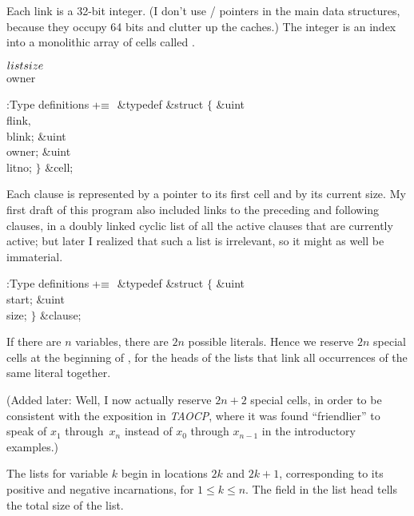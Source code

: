 Each link is a 32-bit integer. (I don't use \CEE/ pointers in the main
data structures, because they occupy 64 bits and clutter up the caches.)
The integer is an index into a monolithic array of cells called .

\Y\B\4\D$\\{listsize}$ \5
\\{owner}\par
\Y\B\4:Type definitions\X${}\mathrel+\equiv{}$\6
\&{typedef} \&{struct} ${}\{{}$\1\6
\&{uint} \\{flink}${},{}$ \\{blink};\6
\&{uint} \\{owner};\6
\&{uint} \\{litno};\2\6
${}\}{}$ \&{cell};\par
\fi

Each clause is represented by a pointer to its first cell and by its
current size. My first draft of this program also included links to the
preceding and following clauses, in a doubly linked cyclic list
of all the active clauses that are currently active; but later I realized
that such a list is irrelevant, so it might as well be immaterial.

\Y\B\4:Type definitions\X${}\mathrel+\equiv{}$\6
\&{typedef} \&{struct} ${}\{{}$\1\6
\&{uint} \\{start};\6
\&{uint} \\{size};\2\6
${}\}{}$ \&{clause};\par
\fi

If there are $n$ variables, there are $2n$ possible literals. Hence we
reserve $2n$ special cells at the beginning of , for the heads of
the lists that link all occurrences of the same literal together.

(Added later: Well, I now actually reserve $2n+2$ special cells, in order
to be consistent with the exposition in {\sl TAOCP}, where it was found
``friendlier'' to speak of $x_1$ through~$x_n$ instead of $x_0$ through
$x_{n-1}$ in the introductory examples.)

The lists for variable $k$ begin in locations $2k$ and $2k+1$, corresponding to
its positive and negative incarnations, for $1\le k\le n$. The 
field
in the list head tells the total size of the list.

